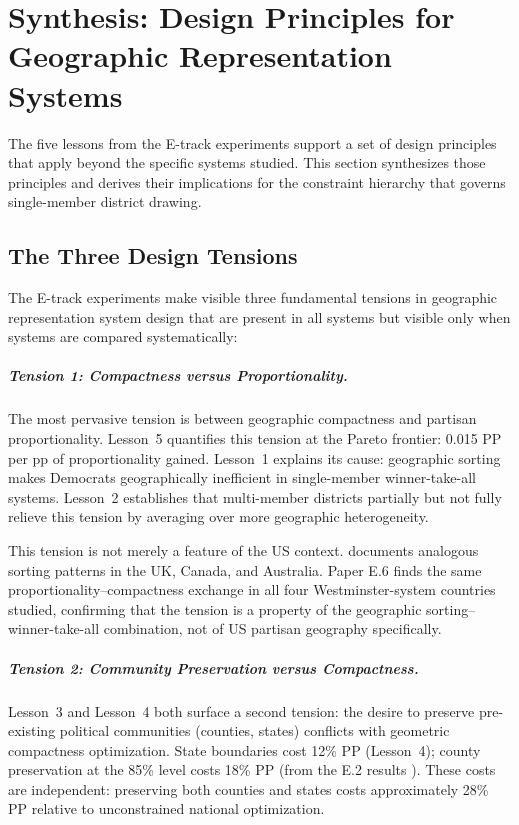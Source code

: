 \section{Synthesis: Design Principles for Geographic Representation Systems}
\label{sec:synthesis}

The five lessons from the E-track experiments support a set of design principles
that apply beyond the specific systems studied.  This section synthesizes those
principles and derives their implications for the constraint hierarchy that
governs single-member district drawing.

\subsection{The Three Design Tensions}

The E-track experiments make visible three fundamental tensions in geographic
representation system design that are present in all systems but visible only
when systems are compared systematically:

\subparagraph{Tension 1: Compactness versus Proportionality.}
The most pervasive tension is between geographic compactness and partisan
proportionality.  Lesson~5 quantifies this tension at the Pareto frontier:
0.015 PP per pp of proportionality gained.  Lesson~1 explains its cause:
geographic sorting makes Democrats geographically inefficient in single-member
winner-take-all systems.  Lesson~2 establishes that multi-member districts
partially but not fully relieve this tension by averaging over more geographic
heterogeneity.

This tension is not merely a feature of the US context.  \citet{rodden2019why}
documents analogous sorting patterns in the UK, Canada, and Australia.
Paper E.6 finds the same proportionality--compactness exchange in all four
Westminster-system countries studied, confirming that the tension is a property
of the geographic sorting--winner-take-all combination, not of US partisan
geography specifically.

\subparagraph{Tension 2: Community Preservation versus Compactness.}
Lesson~3 and Lesson~4 both surface a second tension: the desire to preserve
pre-existing political communities (counties, states) conflicts with geometric
compactness optimization.  State boundaries cost 12\% PP (Lesson~4);
county preservation at the 85\% level costs 18\% PP (from the E.2 results
\citep{dellaLibera2026e2}).  These costs are independent: preserving both
counties and states costs approximately 28\% PP relative to unconstrained
national optimization.

